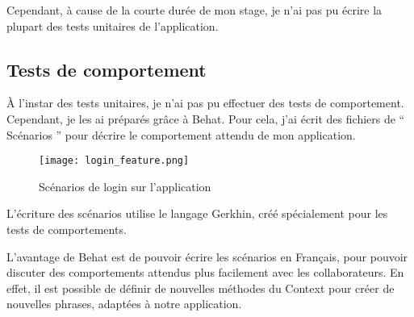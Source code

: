 Cependant, à cause de la courte durée de mon stage, je n'ai pas pu écrire la plupart des tests unitaires de l'application.

\subsection{Tests de comportement}

À l'instar des tests unitaires, je n'ai pas pu effectuer des tests de comportement. Cependant, je les ai préparés grâce à Behat. Pour cela, j'ai écrit des fichiers de `` Scénarios '' pour décrire le comportement attendu de mon application.

\begin{figure}[H]
\begin{center}
\texttt{[image: login\_feature.png]}
\end{center}
\caption{Scénarios de login sur l'application}
\end{figure}

L'écriture des scénarios utilise le langage Gerkhin, créé spécialement pour les tests de comportements.

L'avantage de Behat est de pouvoir écrire les scénarios en Français, pour pouvoir discuter des comportements attendus plus facilement avec les collaborateurs. En effet, il est possible de définir de nouvelles méthodes du Context pour créer de nouvelles phrases, adaptées à notre application.
